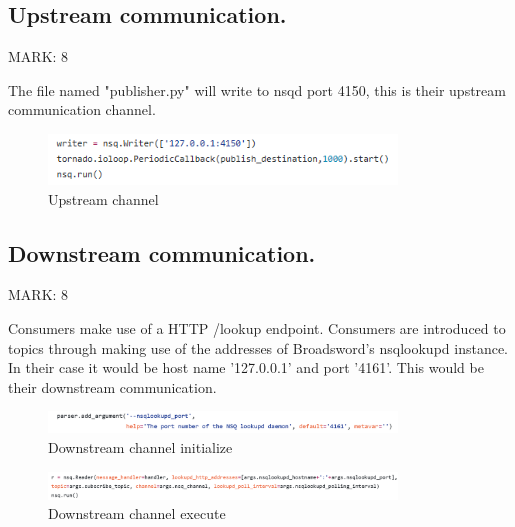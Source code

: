 \documentclass{article}
\begin{document}
\subsection{Upstream communication.}
\begin{flushleft}
MARK: 8
\end{flushleft}

\begin{flushleft}
The file named "publisher.py" will write to nsqd port 4150, this is their upstream communication channel.
\end{flushleft}


\begin{figure}[ht]
  \includegraphics[width=350px]{Images/publisher.PNG}
   \caption{Upstream channel}
  \label{Upstream channel initializer}  
\end{figure}

\subsection{Downstream communication.}
\begin{flushleft}
MARK: 8
\end{flushleft}

\begin{flushleft}
Consumers make use of a HTTP /lookup endpoint. Consumers are introduced to topics through making use of the addresses of Broadsword's nsqlookupd instance. In their case it would be host name '127.0.0.1' and port '4161'. This would be their downstream communication.
\end{flushleft}


\begin{figure}[ht]
  \includegraphics[width=350px]{Images/readerInitialize.PNG}
  \caption{Downstream channel initialize}
  \label{Downstream channel initializer}  
\end{figure}

\begin{figure}[ht]
  \includegraphics[width=350px]{Images/readerExecute.PNG}
  \caption{Downstream channel execute}
  \label{Downstream channel executer}  
\end{figure}
\end{document}

